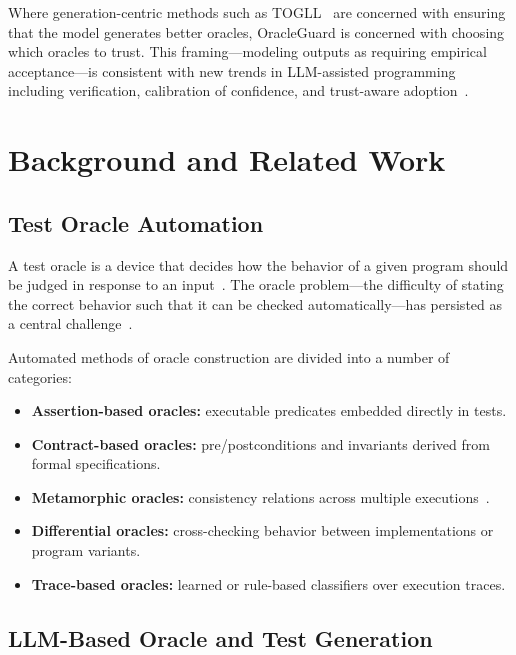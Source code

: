 \documentclass[conference]{IEEEtran}
\begin{document}
Where generation-centric methods such as TOGLL~\cite{hossain2024togll} are concerned with ensuring that the model generates better oracles, OracleGuard is concerned with choosing which oracles to trust. This framing---modeling outputs as requiring empirical acceptance---is consistent with new trends in LLM-assisted programming including verification, calibration of confidence, and trust-aware adoption~\cite{xiong2023express_confidence,liu2024uncertainty_estimation}.

\section{Background and Related Work}

\subsection{Test Oracle Automation}

A test oracle is a device that decides how the behavior of a given program should be judged in response to an input~\cite{molina2025test,barr2015oracle,pezze2014automated}. The oracle problem---the difficulty of stating the correct behavior such that it can be checked automatically---has persisted as a central challenge~\cite{barr2015oracle}.

Automated methods of oracle construction are divided into a number of categories:

\begin{itemize}
\item \textbf{Assertion-based oracles:} executable predicates embedded directly in tests.
\item \textbf{Contract-based oracles:} pre/postconditions and invariants derived from formal specifications.
\item \textbf{Metamorphic oracles:} consistency relations across multiple executions~\cite{segura2016metamorphic,chen2018metamorphic}.
\item \textbf{Differential oracles:} cross-checking behavior between implementations or program variants.
\item \textbf{Trace-based oracles:} learned or rule-based classifiers over execution traces.
\end{itemize}

\subsection{LLM-Based Oracle and Test Generation}
\end{document}

